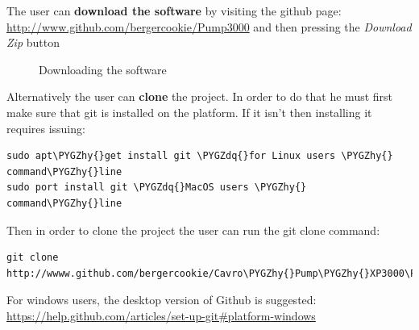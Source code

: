 \documentclass[letterpaper,10pt,english]{sphinxmanual}
\def\PYGZhy{\char`\-}
\def\PYGZdq{\char`\"}
\begin{document}
The user can \textbf{download the software} by visiting the github page:
\href{http://www.github.com/bergercookie/Pump3000}{http://www.github.com/bergercookie/Pump3000} and then pressing
the \emph{Download Zip} button
\begin{figure}[htbp]
\centering
\capstart

\caption{Downloading the software}\label{getting-started:downloading}\end{figure}

Alternatively the user can \textbf{clone} the project. In order to do that he must first make sure that git is installed
on the platform. If it isn't then installing it requires issuing:

\begin{Verbatim}[commandchars=\\\{\}]
sudo apt\PYGZhy{}get install git \PYGZdq{}for Linux users \PYGZhy{} command\PYGZhy{}line
sudo port install git \PYGZdq{}MacOS users \PYGZhy{} command\PYGZhy{}line
\end{Verbatim}

Then in order to clone the project the user can run the git clone command:

\begin{Verbatim}[commandchars=\\\{\}]
git clone http://wwww.github.com/bergercookie/Cavro\PYGZhy{}Pump\PYGZhy{}XP3000\PYGZhy{}GUI.git
\end{Verbatim}

For windows users, the desktop version of Github is suggested:
\href{https://help.github.com/articles/set-up-git\#platform-windows}{https://help.github.com/articles/set-up-git\#platform-windows}
\end{document}
